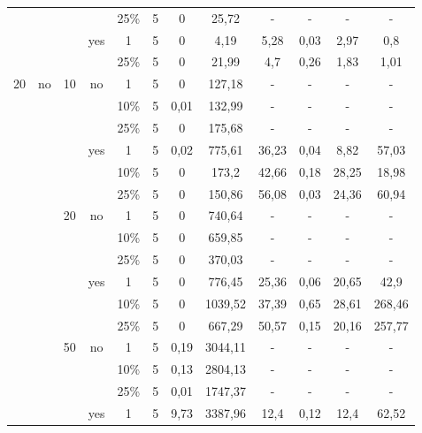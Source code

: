 \begin{table}[h!]
{\begin{tabular}{cccccccccccc}
            &   &   &   & 25\% & 5 & 0 & 25,72 & - & - & - & - \bigstrut[b]\\
            \cline{4-12}      &   &   & \multirow{2}[2]{*}{yes} & 1 & 5 & 0 & 4,19 & 5,28 & 0,03 & 2,97 & 0,8 \bigstrut[t]\\
            &   &   &   & 25\% & 5 & 0 & 21,99 & 4,7 & 0,26 & 1,83 & 1,01 \bigstrut[b]\\
            \hline
            \multirow{24}[16]{*}{20} & \multirow{18}[12]{*}{no} & \multirow{6}[4]{*}{10} & \multirow{3}[2]{*}{no} & 1 & 5 & 0 & 127,18 & - & - & - & - \bigstrut[t]\\
            &   &   &   & 10\% & 5 & 0,01 & 132,99 & - & - & - & - \\
            &   &   &   & 25\% & 5 & 0 & 175,68 & - & - & - & - \bigstrut[b]\\
            \cline{4-12}      &   &   & \multirow{3}[2]{*}{yes} & 1 & 5 & 0,02 & 775,61 & 36,23 & 0,04 & 8,82 & 57,03 \bigstrut[t]\\
            &   &   &   & 10\% & 5 & 0 & 173,2 & 42,66 & 0,18 & 28,25 & 18,98 \\
            &   &   &   & 25\% & 5 & 0 & 150,86 & 56,08 & 0,03 & 24,36 & 60,94 \bigstrut[b]\\
            \cline{3-12}      &   & \multirow{6}[4]{*}{20} & \multirow{3}[2]{*}{no} & 1 & 5 & 0 & 740,64 & - & - & - & - \bigstrut[t]\\
            &   &   &   & 10\% & 5 & 0 & 659,85 & - & - & - & - \\
            &   &   &   & 25\% & 5 & 0 & 370,03 & - & - & - & - \bigstrut[b]\\
            \cline{4-12}      &   &   & \multirow{3}[2]{*}{yes} & 1 & 5 & 0 & 776,45 & 25,36 & 0,06 & 20,65 & 42,9 \bigstrut[t]\\
            &   &   &   & 10\% & 5 & 0 & 1039,52 & 37,39 & 0,65 & 28,61 & 268,46 \\
            &   &   &   & 25\% & 5 & 0 & 667,29 & 50,57 & 0,15 & 20,16 & 257,77 \bigstrut[b]\\
            \cline{3-12}      &   & \multirow{6}[4]{*}{50} & \multirow{3}[2]{*}{no} & 1 & 5 & 0,19 & 3044,11 & - & - & - & - \bigstrut[t]\\
            &   &   &   & 10\% & 5 & 0,13 & 2804,13 & - & - & - & - \\
            &   &   &   & 25\% & 5 & 0,01 & 1747,37 & - & - & - & - \bigstrut[b]\\
            \cline{4-12}      &   &   & \multirow{3}[2]{*}{yes} & 1 & 5 & 9,73 & 3387,96 & 12,4 & 0,12 & 12,4 & 62,52 \bigstrut[t]\\

\end{tabular}}
\end{table}
